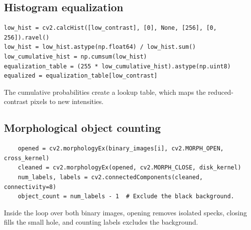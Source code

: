\documentclass[11pt,a4paper]{article}
\begin{document}
\subsection*{Histogram equalization}
\begin{samepage}
\begin{small}
\begin{verbatim}
low_hist = cv2.calcHist([low_contrast], [0], None, [256], [0, 256]).ravel()
low_hist = low_hist.astype(np.float64) / low_hist.sum()
low_cumulative_hist = np.cumsum(low_hist)
equalization_table = (255 * low_cumulative_hist).astype(np.uint8)
equalized = equalization_table[low_contrast]
\end{verbatim}
\end{small}
The cumulative probabilities create a lookup table, which maps the reduced-contrast pixels to new intensities.
\end{samepage}

\subsection*{Morphological object counting}
\begin{samepage}
\begin{small}
\begin{verbatim}
    opened = cv2.morphologyEx(binary_images[i], cv2.MORPH_OPEN, cross_kernel)
    cleaned = cv2.morphologyEx(opened, cv2.MORPH_CLOSE, disk_kernel)
    num_labels, labels = cv2.connectedComponents(cleaned, connectivity=8)
    object_count = num_labels - 1  # Exclude the black background.
\end{verbatim}
\end{small}
Inside the loop over both binary images, opening removes isolated specks, closing fills the small hole, and counting labels excludes the background.
\end{samepage}
\end{document}
